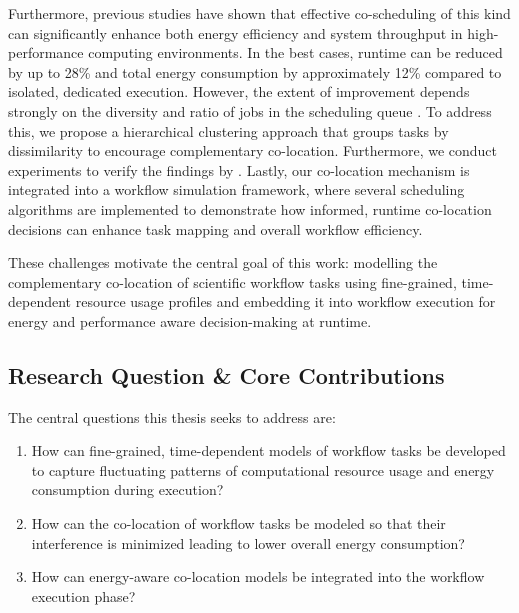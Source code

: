 Furthermore, previous studies have shown that effective co-scheduling of this kind can significantly enhance both energy efficiency and system throughput in high-performance computing environments. In the best cases, runtime can be reduced by up to 28\% and total energy consumption by approximately 12\% compared to isolated, dedicated execution. However, the extent of improvement depends strongly on the diversity and ratio of jobs in the scheduling queue \cite{7349920}. To address this, we propose a hierarchical clustering approach that groups tasks by dissimilarity to encourage complementary co-location. Furthermore, we conduct experiments to verify the findings by \cite{inproceedings}. Lastly, our co-location mechanism is integrated into a workflow simulation framework, where several scheduling algorithms are implemented to demonstrate how informed, runtime co-location decisions can enhance task mapping and overall workflow efficiency.

These challenges motivate the central goal of this work: modelling the complementary co-location of scientific workflow tasks using fine-grained, time-dependent resource usage profiles and embedding it into workflow execution for energy and performance aware decision-making at runtime.
\newpage
\subsection{Research Question \& Core Contributions}
\label{subse:research_question_core_contributions}

The central questions this thesis seeks to address are:

\begin{enumerate}[label=\textbf{RQ}\arabic*]
    \item How can fine-grained, time-dependent models of workflow tasks be developed to capture fluctuating patterns of computational resource usage and energy consumption during execution?
    \item How can the co-location of workflow tasks be modeled so that their interference is minimized leading to lower overall energy consumption?
    \item How can energy-aware co-location models be integrated into the workflow execution phase?
\end{enumerate}

